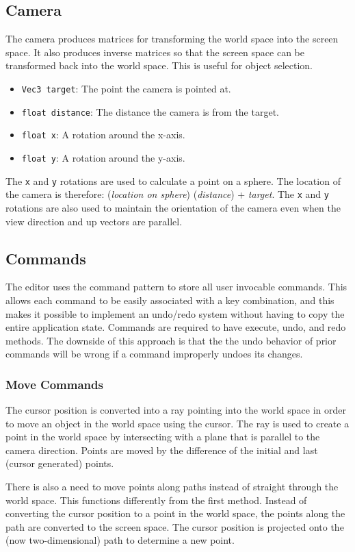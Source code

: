 \documentclass[10pt]{article}
\begin{document}
\subsection{Camera}
The camera produces matrices for transforming the world space into the screen space. It also produces inverse matrices so that the screen space can be transformed back into the world space. This is useful for object selection.
\begin{itemize}
\item \texttt{Vec3 target}: The point the camera is pointed at.
\item \texttt{float distance}: The distance the camera is from the target.
\item \texttt{float x}: A rotation around the x-axis.
\item \texttt{float y}: A rotation around the y-axis.
\end{itemize}
The \texttt{x} and \texttt{y} rotations are used to calculate a point on a sphere. The location of the camera is therefore: (\textit{location on sphere}) (\textit{distance}) + \textit{target}. The \texttt{x} and \texttt{y} rotations are also used to maintain the orientation of the camera even when the view direction and up vectors are parallel.

\subsection{Commands}
The editor uses the command pattern to store all user invocable commands. This allows each command to be easily associated with a key combination, and this makes it possible to implement an undo/redo system without having to copy the entire application state. Commands are required to have execute, undo, and redo methods. The downside of this approach is that the the undo behavior of prior commands will be wrong if a command improperly undoes its changes.

\subsubsection{Move Commands}
The cursor position is converted into a ray pointing into the world space in order to move an object in the world space using the cursor. The ray is used to create a point in the world space by intersecting with a plane that is parallel to the camera direction. Points are moved by the difference of the initial and last (cursor generated) points.

There is also a need to move points along paths instead of straight through the world space. This functions differently from the first method. Instead of converting the cursor position to a point in the world space, the points along the path are converted to the screen space. The cursor position is projected onto the (now two-dimensional) path to determine a new point.
\end{document}
